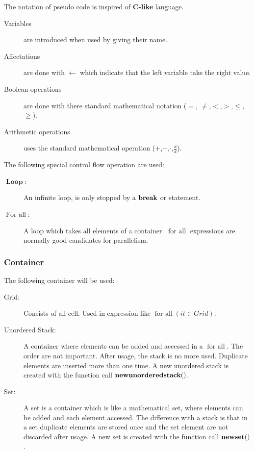 The notation of pseudo code is inspired of \textbf{C-like} language.

\begin{description}
 \item[Variables] are introduced when used by giving their name.
\item[Affectations] are done with $\gets$ which indicate that the left variable take the right value.
\item[Boolean operations] are done with there standard mathematical notation ($=$, $\neq$,$<$,$>$,$\leq$,$\geq$).
\item[Arithmetic operations] uses the standard mathematical operation ($+$,$-$,$\cdot$,$\frac{x}{x}$).
\end{description}

The following special control flow operation are used:
\begin{description}
 \item[$\mathop{\textbf{Loop}}$:] An infinite loop, is only stopped by a $\mathop{\textbf{break}}$ or \Return statement.
 \item[$\mathop{\textbf{For all}}$:] A loop which takes all elements of a container.
 $\mathop{\textbf{for all}}$ expressions are normally good candidates for parallelism.
\end{description}

\subsubsection{Container}

The following container will be used:
\begin{description}
 \item[Grid:] Consists of all cell. Used in expression like $\mathop{\textbf{for all}}(it \in Grid)$.
 \item[Unordered Stack:] A container where elements can be added and accessed in a $\mathop{\textbf{for all}}$. The order are not important.
 After usage, the stack is no more used. Duplicate elements are inserted more than one time.
 A new unordered stack is created with the function call $\mathop{\textbf{newunorderedstack}}()$.
 \item[Set:] A set is a container which is like a mathematical set, where elements can be added and each element accessed.
 The difference with a stack is that in a set duplicate elements are stored once and the set element are not discarded after usage.
 A new set is created with the function call $\mathop{\textbf{newset}}()$.
\end{description}

